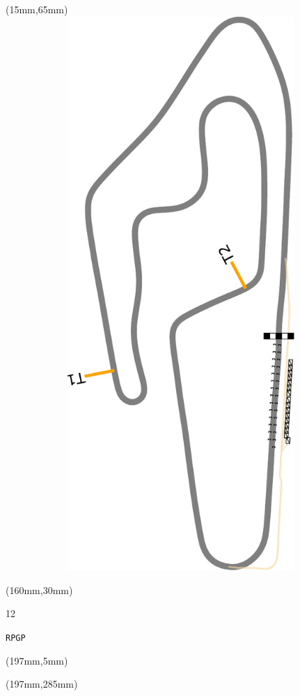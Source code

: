 \begin{textblock*}{185mm}(15mm,65mm)%
\centering
\mbox{\includegraphics[width=185mm,height=210mm,keepaspectratio]{PT/RPGP.pdf}}
\end{textblock*}
\begin{textblock*}{40mm}(160mm,30mm)%
\Large
\par{} 
\par12 
\par\hfill\tiny\tt RPGP\\
\end{textblock*}
\begin{textblock*}{20mm}(197mm,5mm)%
\fbox{\thepage}
\label{RPGP}
\end{textblock*}
\begin{textblock*}{20mm}(197mm,285mm)%
\fbox{\thepage}
\end{textblock*}

